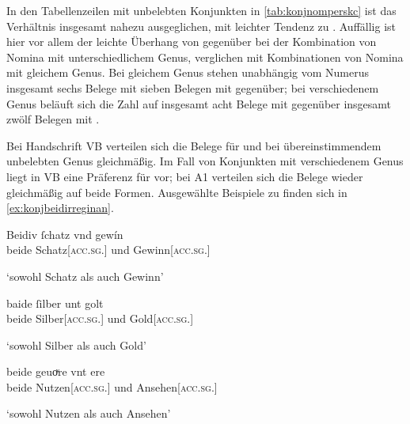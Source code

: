 In den Tabellenzeilen mit unbelebten Konjunkten in \cref{tab:konjnomperskc} ist
das Verhältnis insgesamt nahezu ausgeglichen, mit leichter Tendenz zu
. Auffällig ist hier vor allem der leichte Überhang von
 gegenüber  bei der Kombination von Nomina mit
unterschiedlichem Genus,
verglichen mit Kombinationen von Nomina
mit gleichem Genus. Bei gleichem Genus stehen unabhängig vom Numerus insgesamt
sechs Belege mit  sieben Belegen mit  gegenüber; bei
verschiedenem Genus beläuft sich die Zahl auf insgesamt acht Belege mit
 gegenüber insgesamt zwölf Belegen mit .

Bei Handschrift VB verteilen sich die Belege für  und
 bei übereinstimmendem unbelebten Genus gleichmäßig. Im Fall von
Konjunkten mit verschiedenem Genus liegt in VB eine Präferenz für
 vor; bei A1 verteilen sich die Belege wieder
gleichmäßig auf beide Formen. Ausgewählte Beispiele zu 
finden sich in \cref{ex:konjbeidirreginan}.

\begin{exe}
\ex \label{ex:konjbeidirreginan}
	\begin{xlist}
	\ex \gll Beidiv ſchatz vnd gewín \\
			beide Schatz[\textsc{acc.sg.\MascI}] und Gewinn[\textsc{acc.sg.\MascI}] \\
		\begin{taggedline}{\parencites[\pno~29vb,41]{kc:VB}[vgl.][6112]{schroeder1895}}
		\trans `sowohl Schatz als auch Gewinn'
		\end{taggedline}
		\label{ex:konjbeidirreginan_1}

	\ex \gll baide ſilber unt golt \\
			beide Silber[\textsc{acc.sg.\NeutI}] und Gold[\textsc{acc.sg.\NeutI}] \\
		\begin{taggedline}{\parencites[\pno~68rb,43]{kc:A1}[vgl.][16012]{schroeder1895}}
		\trans `sowohl Silber als auch Gold'
		\end{taggedline}
		\label{ex:konjbeidirreginan_2}

	\ex \gll beide geuoͮre vnt ere \\
			beide Nutzen[\textsc{acc.sg.\NeutI}] und Ansehen[\textsc{acc.sg.\FemI}] \\
		\begin{taggedline}{\parencites[\pno~4ra,16--17]{kc:A1}[vgl.][772]{schroeder1895}}
		\trans `sowohl Nutzen als auch Ansehen'
		\end{taggedline}
		\label{ex:konjbeidirreginan_3}
	\end{xlist}
\end{exe}

